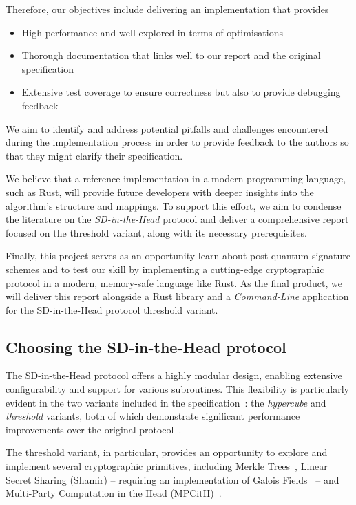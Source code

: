 \documentclass[11pt]{report}
\theoremstyle{definition}
\theoremstyle{plain}
\begin{document}
Therefore, our objectives include delivering an implementation that provides

\begin{itemize}
  \item High-performance and well explored in terms of optimisations
  \item Thorough documentation that links well to our report and the original specification~\cite{aguilarsyndrome11}
  \item Extensive test coverage to ensure correctness but also to provide debugging feedback
\end{itemize}

We aim to identify and address potential pitfalls and challenges encountered during the implementation process in order to provide feedback to the authors so that they might clarify their specification.

We believe that a reference implementation in a modern programming language, such as Rust, will provide future developers with deeper insights into the algorithm's structure and mappings. To support this effort, we aim to condense the literature on the \emph{SD-in-the-Head} protocol and deliver a comprehensive report focused on the threshold variant, along with its necessary prerequisites.

Finally, this project serves as an opportunity learn about post-quantum signature schemes and to test our skill by implementing a cutting-edge cryptographic protocol in a modern, memory-safe language like Rust. As the final product, we will deliver this report alongside a Rust library and a \textit{Command-Line} application for the SD-in-the-Head protocol threshold variant.

\subsection{Choosing the SD-in-the-Head protocol}
The SD-in-the-Head protocol offers a highly modular design, enabling extensive configurability and support for various subroutines. This flexibility is particularly evident in the two variants included in the specification~\cite{aguilarsyndrome11}: the \textit{hypercube} and \textit{threshold} variants, both of which demonstrate significant performance improvements over the original protocol~\cite{feneuil2022syndrome,aguilar2023return,feneuil2023threshold}.

The threshold variant, in particular, provides an opportunity to explore and implement several cryptographic primitives, including Merkle Trees~\cite{becker2008merkle}, Linear Secret Sharing (Shamir) -- requiring an implementation of Galois Fields~\cite{brownadvanced} -- and Multi-Party Computation in the Head (MPCitH)~\cite{baum2020concretely}.
\end{document}
